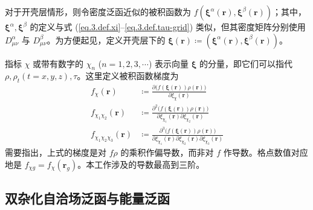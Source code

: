 对于开壳层情形，则令密度泛函近似的被积函数为 $f(\bm{\xi}^\alpha (\bm{r}), \bm{\xi}^\beta (\bm{r}))$；其中，$\bm{\xi}^\alpha, \bm{\xi}^\beta$ 的定义与式 (\ref{eq.3.def.xi}--\ref{eq.3.def.tau-grid}) 类似，但其密度矩阵分别使用 $D_{\mu \nu}^\alpha$ 与 $D_{\mu \nu}^\beta$。为方便起见，定义开壳层下的 $\bm{\xi}(\bm{r}) \coloneq (\bm{\xi}^\alpha (\bm{r}), \bm{\xi}^\beta (\bm{r}))$。

指标 $\chi$ 或带有数字的 $\chi_n$ ($n = 1, 2, 3, \cdots$) 表示向量 $\bm{\xi}$ 的分量，即它们可以指代 $\rho, \rho_t (t = x, y, z), \tau$。这里定义被积函数梯度为
\begin{subequations}
\begin{align}
    \label{eq.3.def.f-chi-1}
    f_{\chi} (\bm{r}) &\coloneq \frac{\partial \big( f (\bm{\xi} (\bm{r})) \rho (\bm{r}) \big)}{\partial \xi_{\chi}(\bm{r})} \\
    \label{eq.3.def.f-chi-2}
    f_{{\chi_1} {\chi_2}} (\bm{r}) &\coloneq \frac{\partial^2 \big( f (\bm{\xi} (\bm{r})) \rho (\bm{r}) \big)}{\partial \xi_{\chi_1}(\bm{r}) \partial \xi_{\chi_2}(\bm{r})} \\
    \label{eq.3.def.f-chi-3}
    f_{{\chi_1} {\chi_2} {\chi_3}} (\bm{r}) &\coloneq \frac{\partial^3 \big( f (\bm{\xi} (\bm{r})) \rho (\bm{r}) \big)}{\partial \xi_{\chi_1}(\bm{r}) \partial \xi_{\chi_2}(\bm{r}) \partial \xi_{\chi_3}(\bm{r})}
\end{align}
\end{subequations}
需要指出，上式的梯度是对 $f \rho$ 的乘积作偏导数，而非对 $f$ 作导数。格点数值对应地是 $f_{\chi g} = f_{\chi} (\bm{r}_g)$。本工作涉及的导数最高到三阶。

\subsection{双杂化自洽场泛函与能量泛函}

